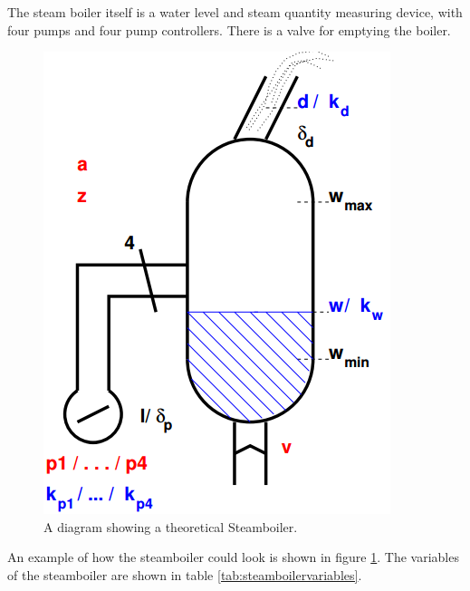 The steam boiler itself is a water level and steam quantity measuring device,
with four pumps and four pump controllers. There is a valve for emptying the
boiler.

\begin{figure}[H]
\centering
\includegraphics[scale=0.5]{Figures/Evaluation/steamboilerimage.png}
\caption{A diagram showing a theoretical Steamboiler. \label{fig:steamboiler}}
\end{figure}

An example of how the steamboiler could look is shown in figure
\ref{fig:steamboiler}. The variables of the steamboiler are shown in table
\ref{tab:steamboilervariables}.


